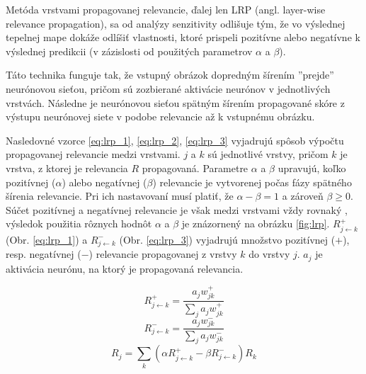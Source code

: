Metóda vrstvami propagovanej relevancie, ďalej len LRP (angl. layer-wise relevance propagation), sa od analýzy senzitivity odlišuje tým, že vo výslednej tepelnej mape dokáže odlíšiť vlastnosti, ktoré prispeli pozitívne alebo negatívne k výslednej predikcii (v zázislosti od použitých parametrov $\alpha$ a $\beta$).

Táto technika funguje tak, že vstupný obrázok dopredným šírením ''prejde'' neurónovou sieťou, pričom sú zozbierané aktivácie neurónov v jednotlivých vrstvách. Následne je neurónovou sieťou spätným šírením propagované skóre z výstupu neurónovej siete v podobe relevancie až k vstupnému obrázku. 

Nasledovné vzorce \ref{eq:lrp_1}, \ref{eq:lrp_2}, \ref{eq:lrp_3} \cite{montavon2018methods} vyjadrujú spôsob výpočtu propagovanej relevancie medzi vrstvami. $j$ a $k$ sú jednotlivé vrstvy, pričom $k$ je vrstva, z ktorej je relevancia $R$ propagovaná. Parametre $\alpha$ a $\beta$ upravujú, koľko pozitívnej ($\alpha$) alebo negatívnej ($\beta$) relevancie je vytvorenej počas fázy spätného šírenia relevancie. Pri ich nastavovaní musí platiť, že $\alpha - \beta = 1$ a zároveň $\beta \geq 0$. Súčet pozitívnej a negatívnej relevancie je však medzi vrstvami vždy rovnaký \cite{montavon2018methods}, výsledok použitia rôznych hodnôt $\alpha$ a $\beta$ je znázornený na obrázku \ref{fig:lrp}. $R_{j\leftarrow k}^{+}$ (Obr. \ref{eq:lrp_1}) a $R_{j\leftarrow k}^{-}$ (Obr. \ref{eq:lrp_3}) vyjadrujú množstvo pozitívnej ($+$), resp. negatívnej ($-$) relevancie propagovanej z vrstvy $k$ do vrstvy $j$. $a_j$ je aktivácia neurónu, na ktorý je propagovaná relevancia.


\begin{equation} 
    R_{j\leftarrow k}^{+} = \frac{a_j w_{j k}^+}{\sum_{j}^{} a_j w_{j k}^+}
    \label{eq:lrp_1}
\end{equation}
\begin{equation} 
    R_{j\leftarrow k}^{-} = \frac{a_j w_{j k}^-}{\sum_{j}^{} a_j w_{j k}^-}
    \label{eq:lrp_2}
\end{equation}
\begin{equation} 
    R_{j}=\sum_{k}^{} \left ( \alpha R_{j\leftarrow k}^{+} - \beta R_{j\leftarrow k}^{-} \right ) R_k
    \label{eq:lrp_3}
\end{equation}

